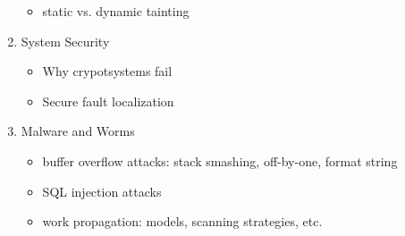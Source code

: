 \documentclass[11pt]{article}
\begin{document}
\begin{enumerate}
\begin{itemize}
\item static vs. dynamic tainting
\end{itemize}
\item System Security 
\begin{itemize}
\item Why crypotsystems fail
\item Secure fault localization
\end{itemize}
\item Malware and Worms
\begin{itemize}
\item buffer overflow attacks: stack smashing, off-by-one, format string
\item SQL injection attacks
\item work propagation: models, scanning strategies, etc.
\end{itemize}

\end{enumerate}
\end{document}
